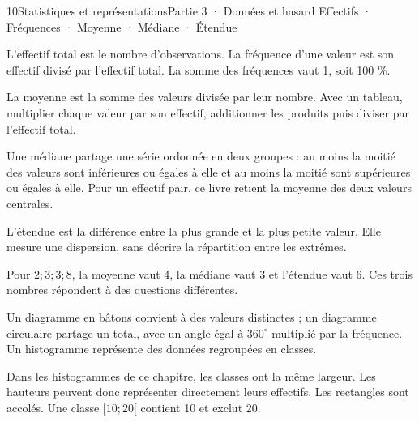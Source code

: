 \begin{ouverture}[courbe]{10}{Statistiques et représentations}{Partie 3 · Données et hasard}
{Effectifs · Fréquences · Moyenne · Médiane · Étendue}
\end{ouverture}
\pagestyle{otMain}\essentiel\fontsize{11}{15}\selectfont
{}
\begin{definition}L’effectif total est le nombre d’observations. La fréquence d’une valeur est son effectif divisé par l’effectif total. La somme des fréquences vaut 1, soit 100 \%.\end{definition}
\begin{propriete}La moyenne est la somme des valeurs divisée par leur nombre. Avec un tableau, multiplier chaque valeur par son effectif, additionner les produits puis diviser par l’effectif total.\end{propriete}
\begin{definition}Une médiane partage une série ordonnée en deux groupes : au moins la moitié des valeurs sont inférieures ou égales à elle et au moins la moitié sont supérieures ou égales à elle. Pour un effectif pair, ce livre retient la moyenne des deux valeurs centrales.\end{definition}
\begin{definition}L’étendue est la différence entre la plus grande et la plus petite valeur. Elle mesure une dispersion, sans décrire la répartition entre les extrêmes.\end{definition}
\begin{exemple}Pour $2;3;3;8$, la moyenne vaut 4, la médiane vaut 3 et l’étendue vaut 6. Ces trois nombres répondent à des questions différentes.\end{exemple}
\clearpage
{}
\begin{savoirfaire}[Représenter]Un diagramme en bâtons convient à des valeurs distinctes ; un diagramme circulaire partage un total, avec un angle égal à $360^\circ$ multiplié par la fréquence. Un histogramme représente des données regroupées en classes.\end{savoirfaire}
\begin{propriete}Dans les histogrammes de ce chapitre, les classes ont la même largeur. Les hauteurs peuvent donc représenter directement leurs effectifs. Les rectangles sont accolés. Une classe $[10;20[$ contient 10 et exclut 20.\end{propriete}
